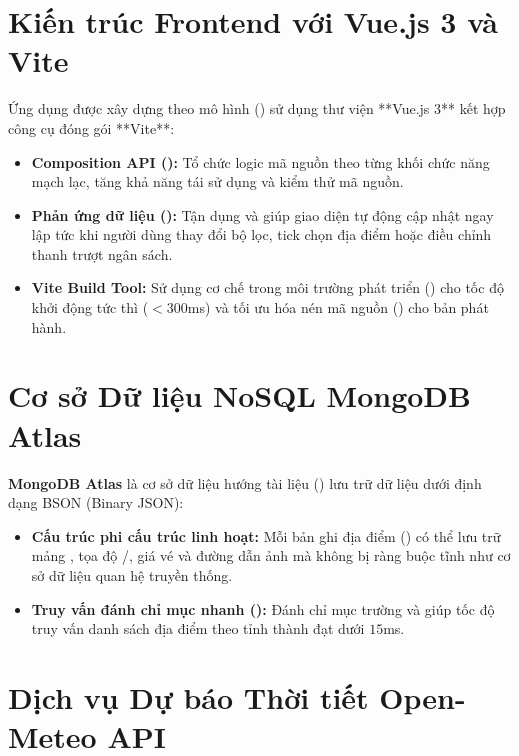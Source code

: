 \section{Kiến trúc Frontend với Vue.js 3 và Vite}

Ứng dụng được xây dựng theo mô hình  () sử dụng thư viện **Vue.js 3** kết hợp công cụ đóng gói **Vite**:

\begin{itemize}
    \item \textbf{Composition API ():} Tổ chức logic mã nguồn theo từng khối chức năng mạch lạc, tăng khả năng tái sử dụng và kiểm thử mã nguồn.
    \item \textbf{Phản ứng dữ liệu ():} Tận dụng  và  giúp giao diện tự động cập nhật ngay lập tức khi người dùng thay đổi bộ lọc, tick chọn địa điểm hoặc điều chỉnh thanh trượt ngân sách.
    \item \textbf{Vite Build Tool:} Sử dụng cơ chế  trong môi trường phát triển () cho tốc độ khởi động tức thì ($< 300$ms) và tối ưu hóa nén mã nguồn () cho bản phát hành.
\end{itemize}

\section{Cơ sở Dữ liệu NoSQL MongoDB Atlas}

\textbf{MongoDB Atlas} là cơ sở dữ liệu hướng tài liệu () lưu trữ dữ liệu dưới định dạng BSON (Binary JSON):
\begin{itemize}
    \item \textbf{Cấu trúc phi cấu trúc linh hoạt:} Mỗi bản ghi địa điểm () có thể lưu trữ mảng , tọa độ /, giá vé  và đường dẫn ảnh  mà không bị ràng buộc tĩnh như cơ sở dữ liệu quan hệ truyền thống.
    \item \textbf{Truy vấn đánh chỉ mục nhanh ():} Đánh chỉ mục trường  và  giúp tốc độ truy vấn danh sách địa điểm theo tỉnh thành đạt dưới $15$ms.
\end{itemize}

\section{Dịch vụ Dự báo Thời tiết Open-Meteo API}

